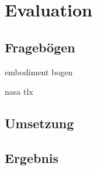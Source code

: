 \chapter{Evaluation}

\section{Fragebögen}
embodiment bogen \cite{Gonzalez-Franco2018}

nasa tlx \cite{HART1988}

\section{Umsetzung}

\section{Ergebnis}
